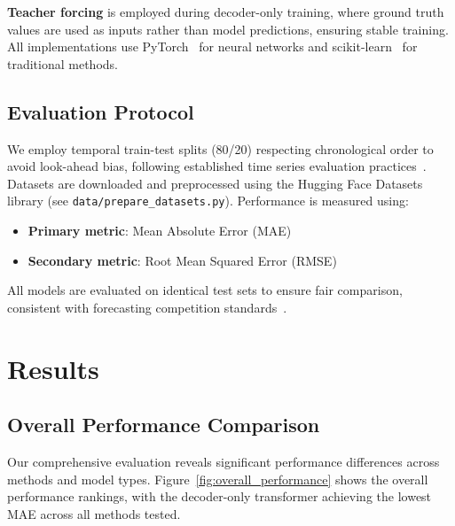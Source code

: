 \documentclass[11pt]{article}
\begin{document}
\textbf{Teacher forcing} is employed during decoder-only training, where ground truth values are used as inputs rather than model predictions, ensuring stable training. All implementations use PyTorch~\cite{paszke2019pytorch} for neural networks and scikit-learn~\cite{pedregosa2011scikit} for traditional methods.

\subsection{Evaluation Protocol}

We employ temporal train-test splits (80/20) respecting chronological order to avoid look-ahead bias, following established time series evaluation practices~\cite{hyndman2018forecasting}. Datasets are downloaded and preprocessed using the Hugging Face Datasets library (see \texttt{data/prepare\_datasets.py}). Performance is measured using:
\begin{itemize}
\item \textbf{Primary metric}: Mean Absolute Error (MAE)
\item \textbf{Secondary metric}: Root Mean Squared Error (RMSE)
\end{itemize}

All models are evaluated on identical test sets to ensure fair comparison, consistent with forecasting competition standards~\cite{makridakis2020m4}.

\section{Results}

\subsection{Overall Performance Comparison}

Our comprehensive evaluation reveals significant performance differences across methods and model types. Figure~\ref{fig:overall_performance} shows the overall performance rankings, with the decoder-only transformer achieving the lowest MAE across all methods tested.
\end{document}
